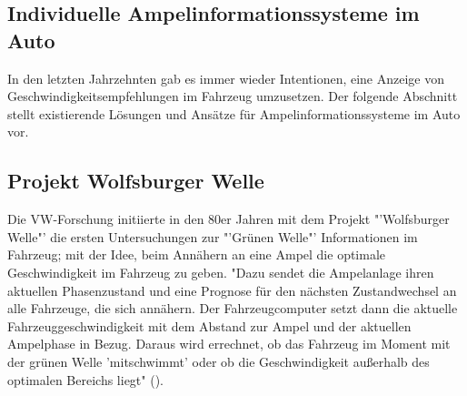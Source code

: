 \subsection{Individuelle Ampelinformationssysteme im Auto}
In den letzten Jahrzehnten gab es immer wieder Intentionen, eine Anzeige von Geschwindigkeitsempfehlungen im Fahrzeug umzusetzen. Der folgende Abschnitt stellt existierende Lösungen und Ansätze für Ampelinformationssysteme im Auto vor.
\subsection*{Projekt Wolfsburger Welle}
Die \gls{VW}-Forschung initiierte in den 80er Jahren mit dem Projekt "'Wolfsburger Welle"' die ersten Untersuchungen zur "'Grünen Welle"' Informationen im Fahrzeug; mit der Idee, beim Annähern an eine Ampel die optimale Geschwindigkeit im Fahrzeug zu geben.\cite{Welle} "Dazu sendet die Ampelanlage ihren aktuellen Phasenzustand und eine Prognose für den nächsten Zustandwechsel an alle Fahrzeuge, die sich annähern. Der Fahrzeugcomputer setzt dann die aktuelle Fahrzeuggeschwindigkeit mit dem Abstand zur Ampel und der aktuellen Ampelphase in Bezug. Daraus wird errechnet, ob das Fahrzeug im Moment mit der grünen Welle ’mitschwimmt’ oder ob die Geschwindigkeit außerhalb des optimalen Bereichs liegt" (\cite{MenschMaschine}).

